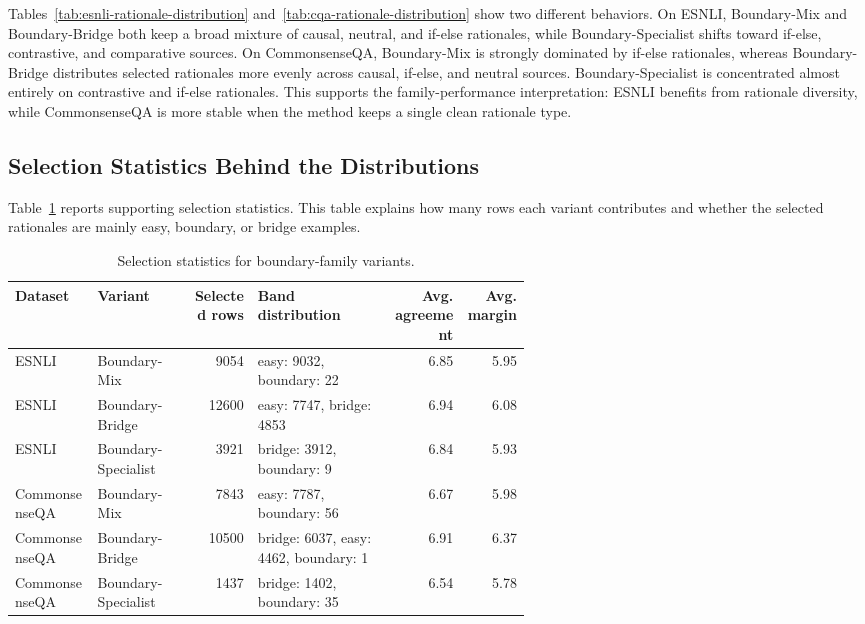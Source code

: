 Tables~\ref{tab:esnli-rationale-distribution} and~\ref{tab:cqa-rationale-distribution} show two different behaviors. On ESNLI, Boundary-Mix and Boundary-Bridge both keep a broad mixture of causal, neutral, and if-else rationales, while Boundary-Specialist shifts toward if-else, contrastive, and comparative sources. On CommonsenseQA, Boundary-Mix is strongly dominated by if-else rationales, whereas Boundary-Bridge distributes selected rationales more evenly across causal, if-else, and neutral sources. Boundary-Specialist is concentrated almost entirely on contrastive and if-else rationales. This supports the family-performance interpretation: ESNLI benefits from rationale diversity, while CommonsenseQA is more stable when the method keeps a single clean rationale type.

\subsection{Selection Statistics Behind the Distributions}
\label{sec:selection-statistics}

Table~\ref{tab:selection-statistics} reports supporting selection statistics. This table explains how many rows each variant contributes and whether the selected rationales are mainly easy, boundary, or bridge examples.

\begin{table}[H]
\centering
\caption{Selection statistics for boundary-family variants.}
\label{tab:selection-statistics}
\begin{tabular}{p{0.16\linewidth} p{0.18\linewidth} r p{0.26\linewidth} r r}
\hline
Dataset & Variant & Selected rows & Band distribution & Avg. agreement & Avg. margin \\
\hline
ESNLI & Boundary-Mix & 9054 & easy: 9032, boundary: 22 & 6.85 & 5.95 \\
ESNLI & Boundary-Bridge & 12600 & easy: 7747, bridge: 4853 & 6.94 & 6.08 \\
ESNLI & Boundary-Specialist & 3921 & bridge: 3912, boundary: 9 & 6.84 & 5.93 \\
CommonsenseQA & Boundary-Mix & 7843 & easy: 7787, boundary: 56 & 6.67 & 5.98 \\
CommonsenseQA & Boundary-Bridge & 10500 & bridge: 6037, easy: 4462, boundary: 1 & 6.91 & 6.37 \\
CommonsenseQA & Boundary-Specialist & 1437 & bridge: 1402, boundary: 35 & 6.54 & 5.78 \\
\hline
\end{tabular}
\end{table}

